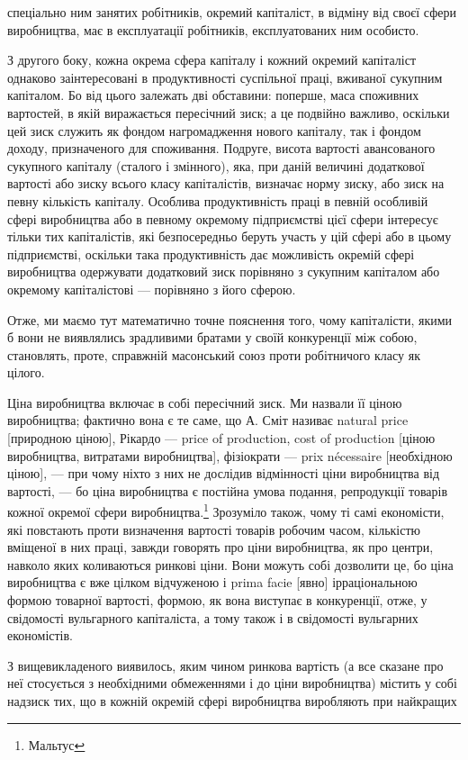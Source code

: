 \parcont{}  %
спеціально ним занятих робітників, окремий капіталіст, в відміну
від своєї сфери виробництва, має в експлуатації робітників, експлуатованих
ним особисто.

З другого боку, кожна окрема сфера капіталу і кожний окремий
капіталіст однаково заінтересовані в продуктивності суспільної
праці, вживаної сукупним капіталом. Бо від цього залежать
дві обставини: поперше, маса споживних вартостей, в якій виражається
пересічний зиск; а це подвійно важливо, оскільки цей
зиск служить як фондом нагромадження нового капіталу, так
і фондом доходу, призначеного для споживання. Подруге, висота
вартості авансованого сукупного капіталу (сталого і змінного),
яка, при даній величині додаткової вартості або зиску всього
класу капіталістів, визначає норму зиску, або зиск на певну
кількість капіталу. Особлива продуктивність праці в певній
особливій сфері виробництва або в певному окремому підприємстві
цієї сфери інтересує тільки тих капіталістів, які безпосередньо
беруть участь у цій сфері або в цьому підприємстві,
оскільки така продуктивність дає можливість окремій сфері
виробництва одержувати додатковий зиск порівняно з сукупним
капіталом або окремому капіталістові — порівняно з його сферою.

Отже, ми маємо тут математично точне пояснення того,
чому капіталісти, якими б вони не виявлялись зрадливими братами
у своїй конкуренції між собою, становлять, проте, справжній
масонський союз проти робітничого класу як цілого.

Ціна виробництва включає в собі пересічний зиск. Ми назвали
її ціною виробництва; фактично вона є те саме, що А. Сміт називає
natural price [природною ціною], Рікардо — price of production,
cost of production [ціною виробництва, витратами виробництва],
фізіократи — prix nécessaire [необхідною ціною], — при
чому ніхто з них не дослідив відмінності ціни виробництва від
вартості, — бо ціна виробництва є постійна умова подання, репродукції
товарів кожної окремої сфери виробництва.\footnote{
Мальтус
} Зрозуміло
також, чому ті самі економісти, які повстають проти визначення
вартості товарів робочим часом, кількістю вміщеної в них праці,
завжди говорять про ціни виробництва, як про центри, навколо
яких коливаються ринкові ціни. Вони можуть собі дозволити це,
бо ціна виробництва є вже цілком відчуженою і prima facie [явно]
ірраціональною формою товарної вартості, формою, як вона виступає
в конкуренції, отже, у свідомості вульгарного капіталіста,
а тому також і в свідомості вульгарних економістів.

З вищевикладеного виявилось, яким чином ринкова вартість
(а все сказане про неї стосується з необхідними обмеженнями
і до ціни виробництва) містить у собі надзиск тих, що в кожній
окремій сфері виробництва виробляють при найкращих
\parbreak{}  %

